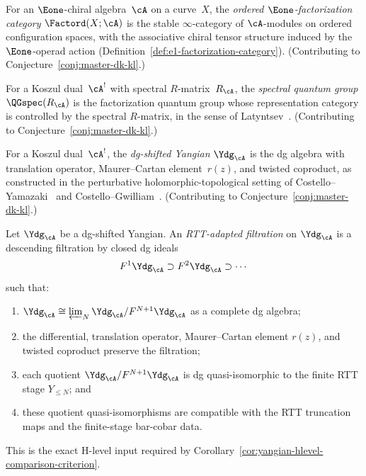 \begin{definition}
\label{def:ordered-e1-factorization}
For an $\Eone$-chiral algebra~$\cA$ on a curve~$X$,
the \emph{ordered $\Eone$-factorization category}
$\Factord(X;\cA)$ is the stable $\infty$-category
of $\cA$-modules on ordered configuration spaces,
with the associative chiral tensor structure induced
by the $\Eone$-operad action
(Definition~\ref{def:e1-factorization-category}).
(Contributing to Conjecture~\ref{conj:master-dk-kl}.)
\end{definition}

\begin{definition}
\label{def:spectral-quantum-group}
For a Koszul dual~$\cA^!$ with spectral $R$-matrix~$R_{\cA}$,
the \emph{spectral quantum group} $\QGspec(R_{\cA})$ is the
factorization quantum group whose representation category
is controlled by the spectral $R$-matrix, in the sense of
Latyntsev~\cite{Latyntsev23}.
(Contributing to Conjecture~\ref{conj:master-dk-kl}.)
\end{definition}

\begin{definition}
\label{def:dg-shifted-yangian}
For a Koszul dual~$\cA^!$, the \emph{dg-shifted Yangian}
$\Ydg_{\cA}$ is the dg algebra with translation operator,
Maurer--Cartan element~$r(z)$, and twisted coproduct,
as constructed in the perturbative holomorphic-topological
setting of Costello--Yamazaki~\cite{costello-yamazaki} and
Costello--Gwilliam~\cite{CG17}.
(Contributing to Conjecture~\ref{conj:master-dk-kl}.)
\end{definition}

\begin{definition}
\label{def:rtt-adapted-filtration}
Let $\Ydg_{\cA}$ be a dg-shifted Yangian.  An
\emph{RTT-adapted filtration} on $\Ydg_{\cA}$ is a descending
filtration by closed dg ideals
\[
F^1\Ydg_{\cA} \supset F^2\Ydg_{\cA} \supset \cdots
\]
such that:
\begin{enumerate}
\item $\Ydg_{\cA} \cong
  \varprojlim_N \Ydg_{\cA}/F^{N+1}\Ydg_{\cA}$ as a complete dg algebra;
\item the differential, translation operator, Maurer--Cartan element
  $r(z)$, and twisted coproduct preserve the filtration;
\item each quotient
  $\Ydg_{\cA}/F^{N+1}\Ydg_{\cA}$ is dg quasi-isomorphic to the finite
  RTT stage $Y_{\le N}$; and
\item these quotient quasi-isomorphisms are compatible with the RTT
  truncation maps and the finite-stage bar-cobar data.
\end{enumerate}
This is the exact H-level input required by
Corollary~\ref{cor:yangian-hlevel-comparison-criterion}.
\end{definition}

